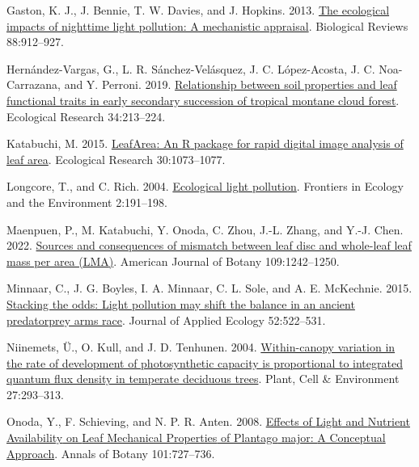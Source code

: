 \documentclass[
  12pt,
  letterpaper,
  DIV=11,
  numbers=noendperiod]{scrartcl}
\newlength{\cslhangindent}
\newlength{\cslentryspacingunit} %
\newenvironment{CSLReferences}[2] %
 {%
  \setlength{\parindent}{0pt}
  \ifodd #1
  \let\oldpar\par
  \def\par{\hangindent=\cslhangindent\oldpar}
  \fi
  \setlength{\parskip}{#2\cslentryspacingunit}
 }%
 {}
\begin{document}
\begin{CSLReferences}{1}{0}
\leavevmode{}%
Gaston, K. J., J. Bennie, T. W. Davies, and J. Hopkins. 2013.
\href{https://doi.org/10.1111/brv.12036}{The ecological impacts of
nighttime light pollution: A mechanistic appraisal}. Biological Reviews
88:912--927.

\leavevmode{}%
Hernández-Vargas, G., L. R. Sánchez-Velásquez, J. C. López-Acosta, J. C.
Noa-Carrazana, and Y. Perroni. 2019.
\href{https://doi.org/10.1111/1440-1703.1267}{Relationship between soil
properties and leaf functional traits in early secondary succession of
tropical montane cloud forest}. Ecological Research 34:213--224.

\leavevmode{}%
Katabuchi, M. 2015.
\href{https://doi.org/10.1007/s11284-015-1307-x}{{LeafArea}: An {R}
package for rapid digital image analysis of leaf area}. Ecological
Research 30:1073--1077.

\leavevmode{}%
Longcore, T., and C. Rich. 2004.
\href{https://doi.org/10.1890/1540-9295(2004)002\%5B0191:ELP\%5D2.0.CO;2}{Ecological
light pollution}. Frontiers in Ecology and the Environment 2:191--198.

\leavevmode{}%
Maenpuen, P., M. Katabuchi, Y. Onoda, C. Zhou, J.-L. Zhang, and Y.-J.
Chen. 2022. \href{https://doi.org/10.1002/ajb2.16038}{Sources and
consequences of mismatch between leaf disc and whole-leaf leaf mass per
area ({LMA})}. American Journal of Botany 109:1242--1250.

\leavevmode{}%
Minnaar, C., J. G. Boyles, I. A. Minnaar, C. L. Sole, and A. E.
McKechnie. 2015. \href{https://doi.org/10.1111/1365-2664.12381}{Stacking
the odds: Light pollution may shift the balance in an ancient
predator\textendash prey arms race}. Journal of Applied Ecology
52:522--531.

\leavevmode{}%
Niinemets, Ü., O. Kull, and J. D. Tenhunen. 2004.
\href{https://doi.org/10.1111/j.1365-3040.2003.01143.x}{Within-canopy
variation in the rate of development of photosynthetic capacity is
proportional to integrated quantum flux density in temperate deciduous
trees}. Plant, Cell \& Environment 27:293--313.

\leavevmode{}%
Onoda, Y., F. Schieving, and N. P. R. Anten. 2008.
\href{https://doi.org/10.1093/aob/mcn013}{Effects of {Light} and
{Nutrient Availability} on {Leaf Mechanical Properties} of {Plantago}
major: {A Conceptual Approach}}. Annals of Botany 101:727--736.


\end{CSLReferences}
\end{document}
